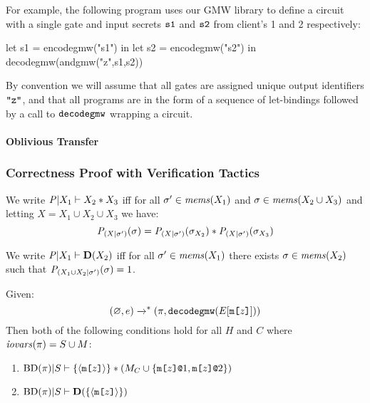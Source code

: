 For example, the following program uses our GMW library to define
a circuit with a single \eand gate and input secrets $\texttt{s1}$ and
$\texttt{s2}$ from client's 1 and 2 respectively:
\begin{verbatimtab}
         let s1 = encodegmw("s1") in
         let s2 = encodegmw("s2") in
         decodegmw(andgmw("z",s1,s2))
\end{verbatimtab}
By convention we will assume that all gates are assigned unique output
identifiers $\texttt{"z"}$, and that all programs are in the form
of a sequence of let-bindings followed by a call to $\texttt{decodegmw}$
wrapping a circuit.

\paragraph{Oblivious Transfer} 

\subsubsection{Correctness Proof with Verification Tactics}

\begin{definition}
  We write $\mathit{P}|X_1 \vdash X_2 * X_3$ iff for all
  $\sigma' \in \mathit{mems}(X_1)$ and $\sigma \in \mathit{mems}(X_2 \cup X_3)$
  and letting $X = X_1 \cup X_2 \cup X_3$ we have:
  $$\mathit{P}_{({X}|{\sigma'})}(\sigma) =
  \mathit{P}_{({X}|{\sigma'})}(\sigma_{X_2}) *
  \mathit{P}_{({X}|{\sigma'})}(\sigma_{X_3})$$
\end{definition}

\begin{definition}  
  We write $\mathit{P}|X_1 \vdash \mathbf{D}(X_2)$ iff for all
  $\sigma' \in \mathit{mems}(X_1)$ there exists 
  $\sigma \in \mathit{mems}(X_2)$ such that
  $\mathit{P}_{({X_1 \cup X_2}|{\sigma'})}(\sigma) = 1$.
\end{definition}


\begin{lemma}
  \label{lemma-gmwinvariant}
  Given:
  $$ (\varnothing,e) \xrightarrow{}^{*} (\pi,\texttt{decodegmw}(E[\texttt{m[}z\texttt{]}])) $$
  Then both of the following conditions hold for all $H$ and $C$ where $\mathit{iovars}(\pi) = S \cup M$:
  \begin{enumerate}
    \item $\mathrm{BD}(\pi)|S \vdash \{\langle \texttt{m[}z\texttt{]} \rangle\} * (M_C \cup \{ \texttt{m[}z\texttt{]}\texttt{@}1, \texttt{m[}z\texttt{]}\texttt{@}2 \})$
    \item $\mathrm{BD}(\pi)|S \vdash \mathbf{D}(\{\langle \texttt{m[}z\texttt{]} \rangle\})$
  \end{enumerate}
\end{lemma}

